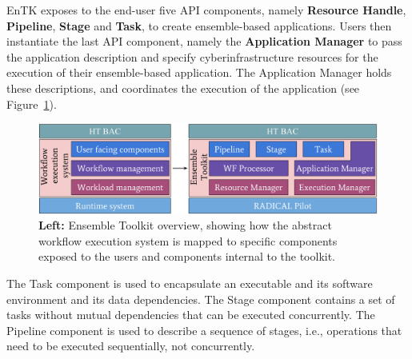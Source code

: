 

EnTK exposes to the end-user five API components, namely \textbf{Resource Handle}, 
\textbf{Pipeline}, \textbf{Stage} and \textbf{Task}, to create ensemble-based applications. 
Users then instantiate the last API component, namely the \textbf{Application Manager}  
to pass the application description and specify cyberinfrastructure resources for the 
execution of their ensemble-based application. The Application Manager holds these 
descriptions, and coordinates the 
execution of the application (see Figure~\ref{fig:entk_arch}).

\begin{figure}
  \centering
  \includegraphics[width=\columnwidth]{FIGURES/entk_overview.pdf}
  \caption{\textbf{Left:} Ensemble Toolkit overview, showing how the abstract
           workflow execution system is mapped to specific components exposed
           to the users and components internal to the
           toolkit.}\label{fig:entk_arch}
\end{figure}


The Task component is used to encapsulate an executable and its software 
environment and its data dependencies. The Stage component contains a set 
of tasks without mutual dependencies that can be executed concurrently. 
The Pipeline component is used to describe a sequence of
stages, i.e., operations that need to be executed sequentially, not concurrently.

